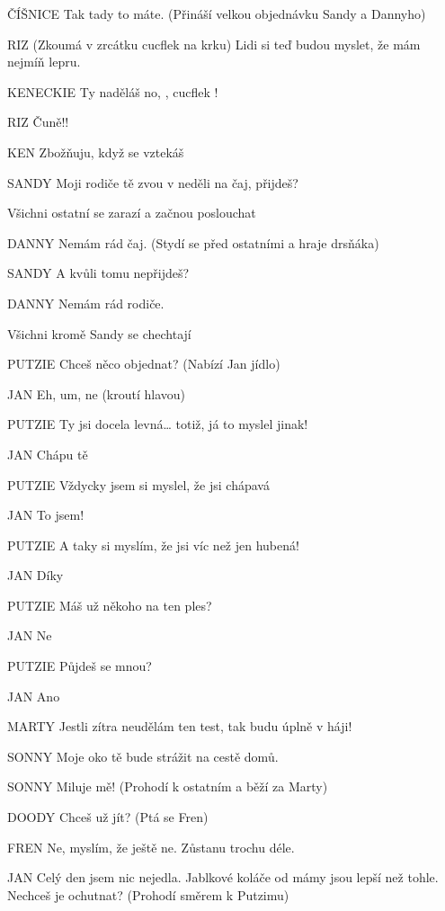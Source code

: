 ČÍŠNICE        Tak tady to máte. (Přináší velkou objednávku Sandy a Dannyho) 

RIZ         (Zkoumá v zrcátku cucflek na krku) Lidi si teď budou myslet, že mám         nejmíň lepru. 

KENECKIE        Ty naděláš no, , cucflek ! 

RIZ                Čuně!! 

KEN        Zbožňuju, když se vztekáš 

SANDY        Moji rodiče tě zvou v neděli na čaj, přijdeš? 

Všichni ostatní se zarazí a začnou poslouchat 

DANNY        Nemám rád čaj. (Stydí se před ostatními a hraje drsňáka) 

SANDY         A kvůli tomu nepřijdeš? 

DANNY        Nemám rád rodiče. 

Všichni kromě Sandy se chechtají 

PUTZIE        Chceš něco objednat? (Nabízí Jan jídlo) 

JAN        Eh, um, ne (kroutí hlavou) 

PUTZIE         Ty jsi docela levná… totiž, já to myslel jinak! 

JAN        Chápu tě 

PUTZIE        Vždycky jsem si myslel, že jsi chápavá 

JAN        To jsem! 

PUTZIE        A taky si myslím, že jsi víc než jen hubená!

JAN        Díky 

PUTZIE         Máš už někoho na ten ples? 

JAN        Ne

PUTZIE        Půjdeš se mnou? 

JAN        Ano 

MARTY        Jestli zítra neudělám ten test, tak budu úplně v háji!

SONNY        Moje oko tě bude strážit na cestě domů. 

SONNY        Miluje mě! (Prohodí k ostatním a běží za Marty) 

DOODY        Chceš už jít? (Ptá se Fren)

FREN        Ne, myslím, že ještě ne. Zůstanu trochu déle. 

JAN        Celý den jsem nic nejedla. Jablkové koláče od mámy jsou lepší než                 tohle. Nechceš je ochutnat? (Prohodí směrem k Putzimu) 

